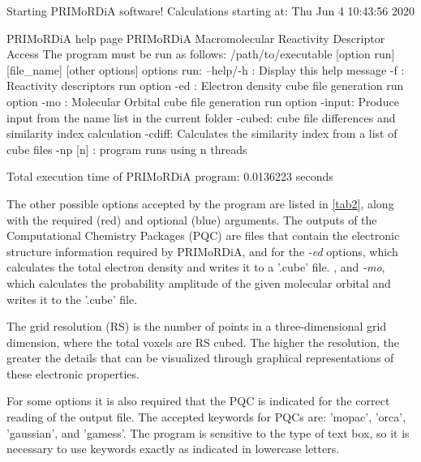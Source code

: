 \documentclass[a4paper,11pt]{refart}
\begin{document}
\hspace*{-\leftmarginwidth}
\begin{minipage}{\fullwidth}
	\begin{shell}
		Starting PRIMoRDiA software! 
		Calculations starting at: Thu Jun  4 10:43:56 2020
		
		PRIMoRDiA help page
		PRIMoRDiA Macromolecular Reactivity Descriptor Access
		The program must be run as follows:
		/path/to/executable [option run] [file\_name] [other options] 
		options run:
		--help/-h : Display this help message
		-f    : Reactivity descriptors run option
		-ed   : Electron density cube file generation run option
		-mo   : Molecular Orbital cube file generation run option
		-input: Produce input from the name list in the current folder
		-cubed: cube file differences and similarity index calculation
		-cdiff: Calculates the similarity index from a list of cube files
		-np [n] : program runs using n threads
		
		Total execution time of PRIMoRDiA program: 0.0136223 seconds
	\end{shell}
\end{minipage}

The other possible options accepted by the program are listed in \autoref{tab2}, along with the required (red) and optional (blue) arguments. The outputs of the Computational Chemistry Packages (PQC) are files that contain the electronic structure information required by PRIMoRDiA, and for the \emph{-ed} options, which calculates the total electron density and writes it to a '.cube' file. , and \emph{-mo}, which calculates the probability amplitude of the given molecular orbital and writes it to the '.cube' file.

The grid resolution (RS) is the number of points in a three-dimensional grid dimension, where the total voxels are RS cubed. The higher the resolution, the greater the details that can be visualized through graphical representations of these electronic properties.

For some options it is also required that the PQC is indicated for the correct reading of the output file. The accepted keywords for PQCs are: 'mopac', 'orca', 'gaussian', and 'gamess'. The program is sensitive to the type of text box, so it is necessary to use keywords exactly as indicated in lowercase letters.
\end{document}
